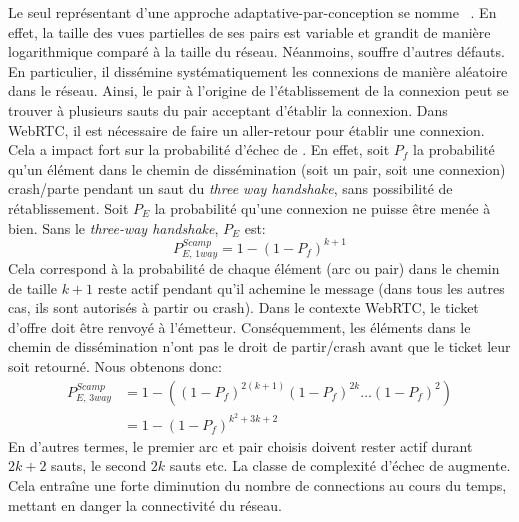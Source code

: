 Le seul représentant d'une approche adaptative-par-conception se nomme
\SCAMP~\cite{ganesh2001scamp, ganesh2003peer}.  En effet, la taille des vues
partielles de ses pairs est variable et grandit de manière logarithmique comparé
à la taille du réseau. Néanmoins, \SCAMP souffre d'autres défauts. En
particulier, il dissémine systématiquement les connexions de manière aléatoire
dans le réseau. Ainsi, le pair à l'origine de l'établissement de la connexion
peut se trouver à plusieurs sauts du pair acceptant d'établir la connexion. Dans
WebRTC, il est nécessaire de faire un aller-retour pour établir une
connexion. Cela a impact fort sur la probabilité d'échec de \SCAMP. En effet,
soit $P_f$ la probabilité qu'un élément dans le chemin de dissémination (soit un
pair, soit une connexion) crash/parte pendant un saut du \emph{three way
  handshake}, sans possibilité de rétablissement. Soit $P_E$ la probabilité
qu'une connexion ne puisse être menée à bien. Sans le \emph{three-way
  handshake}, $P_E$ est:
\begin{equation}
  P_{E,\,1way}^{Scamp}= 1 - (1-P_f)^{k+1}
\end{equation}
Cela correspond à la probabilité de chaque élément (arc ou pair) dans le chemin
de taille $k+1$ reste actif pendant qu'il achemine le message (dans tous les
autres cas, ils sont autorisés à partir ou crash). Dans le contexte WebRTC, le
ticket d'offre doit être renvoyé à l'émetteur. Conséquemment, les éléments dans
le chemin de dissémination n'ont pas le droit de partir/crash avant que le
ticket leur soit retourné. Nous obtenons donc:
\begin{align} P_{E,\,3way}^{Scamp} &=1 - ((1-P_f)^{2(k+1)} (1-P_f)^{2k}
                                     \ldots (1-P_f)^2) \nonumber \\
                                   &=1-(1-P_f)^{k^2+3k+2}
\end{align}
En d'autres termes, le premier arc et pair choisis doivent rester actif durant
$2k+2$ sauts, le second $2k$ sauts etc. La classe de complexité d'échec de
\SCAMP augmente. Cela entraîne une forte diminution du nombre de connections au
cours du temps, mettant en danger la connectivité du réseau.

